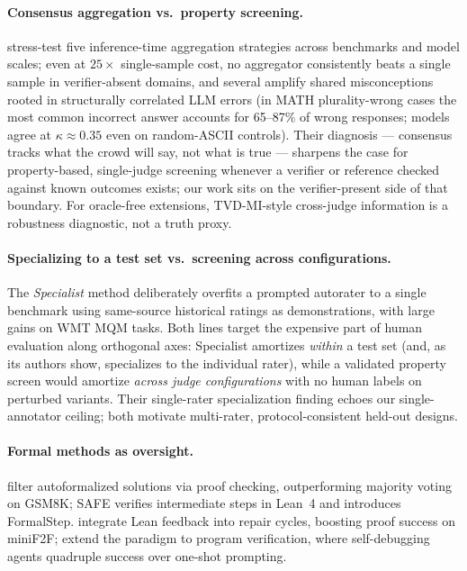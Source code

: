 \documentclass{article}
\begin{document}
\paragraph{Consensus aggregation vs.\ property screening.}
\citet{denisovblanch2026consensus} stress-test five inference-time aggregation strategies across benchmarks and model scales; even at $25\times$ single-sample cost, no aggregator consistently beats a single sample in verifier-absent domains, and several amplify shared misconceptions rooted in structurally correlated LLM errors (in MATH plurality-wrong cases the most common incorrect answer accounts for 65--87\% of wrong responses; models agree at $\kappa \approx 0.35$ even on random-ASCII controls).
Their diagnosis --- consensus tracks what the crowd will say, not what is true --- sharpens the case for property-based, single-judge screening whenever a verifier or reference checked against known outcomes exists; our work sits on the verifier-present side of that boundary.
For oracle-free extensions, TVD-MI-style cross-judge information is a robustness diagnostic, not a truth proxy.

\paragraph{Specializing to a test set vs.\ screening across configurations.}
The \emph{Specialist} method \citep{finkelstein2024specialist} deliberately overfits a prompted autorater to a single benchmark using same-source historical ratings as demonstrations, with large gains on WMT MQM tasks.
Both lines target the expensive part of human evaluation along orthogonal axes: Specialist amortizes \emph{within} a test set (and, as its authors show, specializes to the individual rater), while a validated property screen would amortize \emph{across judge configurations} with no human labels on perturbed variants.
Their single-rater specialization finding echoes our single-annotator ceiling; both motivate multi-rater, protocol-consistent held-out designs.

\paragraph{Formal methods as oversight.}
\citet{zhou2024donttrustverify} filter autoformalized solutions via proof checking, outperforming majority voting on GSM8K; SAFE \citep{liu2025safe} verifies intermediate steps in Lean~4 and introduces FormalStep.
\citet{ospanov2023apollo} integrate Lean feedback into repair cycles, boosting proof success on miniF2F; \citet{miranda2026veribench} extend the paradigm to program verification, where self-debugging agents quadruple success over one-shot prompting.
\end{document}
